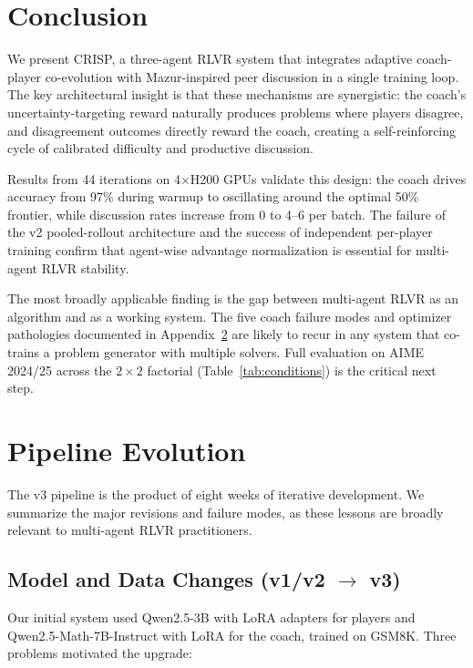 \documentclass{article}
\begin{document}
\section{Conclusion}

We present CRISP, a three-agent RLVR system that integrates adaptive coach-player co-evolution with Mazur-inspired peer discussion in a single training loop. The key architectural insight is that these mechanisms are synergistic: the coach's uncertainty-targeting reward naturally produces problems where players disagree, and disagreement outcomes directly reward the coach, creating a self-reinforcing cycle of calibrated difficulty and productive discussion.

Results from 44 iterations on 4$\times$H200 GPUs validate this design: the coach drives accuracy from 97\% during warmup to oscillating around the optimal 50\% frontier, while discussion rates increase from 0 to 4--6 per batch. The failure of the v2 pooled-rollout architecture and the success of independent per-player training confirm that agent-wise advantage normalization is essential for multi-agent RLVR stability.

The most broadly applicable finding is the gap between multi-agent RLVR as an algorithm and as a working system. The five coach failure modes and optimizer pathologies documented in Appendix~\ref{sec:evolution} are likely to recur in any system that co-trains a problem generator with multiple solvers. Full evaluation on AIME 2024/25 across the $2 \times 2$ factorial (Table~\ref{tab:conditions}) is the critical next step.





\appendix

\section{Pipeline Evolution}
\label{sec:evolution}

The v3 pipeline is the product of eight weeks of iterative development. We summarize the major revisions and failure modes, as these lessons are broadly relevant to multi-agent RLVR practitioners.

\subsection{Model and Data Changes (v1/v2 $\rightarrow$ v3)}

Our initial system used Qwen2.5-3B with LoRA adapters for players and Qwen2.5-Math-7B-Instruct with LoRA for the coach, trained on GSM8K. Three problems motivated the upgrade:
\end{document}
